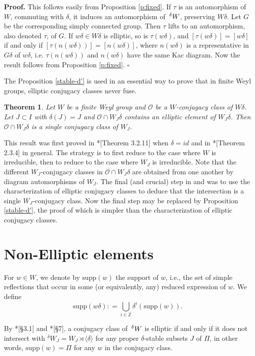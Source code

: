 \documentclass[10pt,leqno]{article}
\newtheorem{theorem}[equation]{Theorem}
\newcommand{\qed}{\hfill $\square$ \medskip}
\newenvironment{proof}[1][Proof]{\noindent\textbf{#1.} }{\qed}
\renewcommand{\sec}[1]{\section{#1}
\renewcommand{\theequation}{\thesection.\arabic{equation}}
  \setcounter{equation}{0}}
\newcommand{\Wext}{\negthinspace\negthinspace\phantom{a}^\delta W}
\def\d{\delta}
\renewcommand{\sec}[1]{\section{#1}
\renewcommand{\theequation}{\thesection.\arabic{equation}}
  \setcounter{equation}{0}}
\begin{document}
\begin{proof}
  This follows easily from Proposition \ref{p:fixed}. If $\tau$ is an
  automorphism of $W$, commuting with $\delta$, it induces an
  automorphism of $\Wext$, preserving $W\delta$. Let $G$ be the corresponding simply connected group.
  Then $\tau$ lifts to an automorphism, also denoted $\tau$, of $G$.
  If $w\delta\in W\delta$ is elliptic, so is $\tau(w\delta)$, and
  $[\tau(w\delta)]=[w\delta]$ if and only if $[\tau(n(w\delta))]=[n(w\delta)]$, where $n(w\delta)$ is a representative
  in $G\delta$ of $w\delta$, i.e. $\tau(n(w\delta))$ and $n(w\delta)$ have the same Kac diagram.
  Now the result follows from Proposition \ref{p:fixed}.
\end{proof}

The Proposition \ref{stable-d'} is used in an essential way to prove that in finite Weyl groups, elliptic conjugacy classes never fuse. 

\begin{theorem}\label{fuse}
	Let $W$ be a finite Weyl group and $\mathcal O$ be a $W$-conjugacy class of $W \d$. Let $J \subset I$ with $\d(J)=J$ and $\mathcal O \cap W_J \d$ contains an elliptic element of $W_J \d$. Then $\mathcal O \cap W_J \d$ is a single conjugacy class of $W_J$. 
\end{theorem}

This result was first proved in \cite{geck_pfeiffer}*[Theorem 3.2.11] when $\d=id$ and in
\cite{CH}*[Theorem 2.3.4] in general. The strategy is to first reduce to the case where $W$ is irreducible, then to reduce to the case where $W_J$ is irreducible. Note that the different $W_J$-conjugacy classes in $\mathcal O \cap W_J \d$ are obtained from one another by diagram automorphisms of $W_J$. The final (and crucial) step in \cite{geck_pfeiffer} and \cite{CH} was to use the characterization of elliptic conjugacy classes to deduce that the intersection is a single $W_J$-conjugacy class. Now the final step may be replaced by Proposition \ref{stable-d'}, the proof of which is simpler than the characterization of elliptic conjugacy classes. 

\sec{Non-Elliptic elements}
\label{s:nonelliptic}

For $w \in W$, we denote by $\text{supp}(w)$ the support of $w$, i.e., the set of simple reflections that occur in some (or equivalently, any) reduced expression of $w$. We define $$\text{supp}(w\delta): =\bigcup_{i \in \mathbb Z} \delta^i(\text{supp}(w)).$$ 

By \cite{geck_pfeiffer}*[\S 3.1] and
\cite{he_minimal_length_double_cosets}*[\S 7], a conjugacy class of $\Wext$ is
elliptic if and only if it does not intersect with
${}^\delta W_J=W_J \rtimes \langle \delta \rangle$ for any proper
$\delta$-stable subsets $J$ of $\Pi$, in other words,
$\text{supp}(w)=\Pi$ for any $w$ in the conjugacy class.
\end{document}
